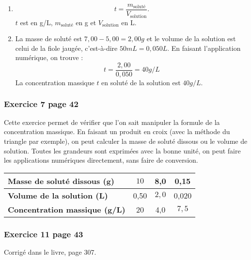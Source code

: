 \documentclass[12pt,a4paper]{article}
\begin{document}
\begin{enumerate}
\item
\begin{equation}
t = \frac{m_\mathrm{soluté}}{V_\mathrm{solution}}.
\nonumber
\end{equation}
$t$ est en g/L, $m_\mathrm{soluté}$ en g et $V_\mathrm{solution}$ en L.
\item La masse de soluté est $7{,}00-5{,}00=\unit{2{,}00}{g}$ et le volume de la solution est celui de la fiole jaugée, c'est-à-dire $\unit{50}{mL}=\unit{0{,}050}{L}$.
En faisant l'application numérique, on trouve :
\begin{equation}
t = \frac{2{,}00}{0{,}050} = \unit{40}{g/L} 
\nonumber
\end{equation}
La concentration massique $t$ en soluté de la solution est $\unit{40}{g/L}$.
\end{enumerate}

\subsubsection*{Exercice 7 page 42}

Cette exercice permet de vérifier que l'on sait manipuler la formule de la concentration massique.
En faisant un \og produit en croix \fg{} (avec la méthode du triangle par exemple), on peut calculer la masse de soluté dissous ou le volume de solution.
Toutes les grandeurs sont exprimées avec la bonne unité, on peut faire les applications numériques directement, sans faire de conversion.

\begin{table}[h]
\center
\begin{tabular}{|l|c|c|c|}
\hline
\textbf{Masse de soluté dissous (g)}		& {\color{bleu_f}$10$}	& 8{,}0								& 0{,}15							\\
\hline
\textbf{Volume de la solution (L)}   		& 0{,}50							& {\color{bleu_f}$2{,}0$}	& 0{,}020						\\
\hline
\textbf{Concentration massique (g/L)}	& 20								& 4{,}0								& {\color{bleu_f}$7{,}5$}	\\
\hline
\end{tabular}
\end{table}

\subsubsection*{Exercice 11 page 43}

Corrigé dans le livre, page 307.
\end{document}
